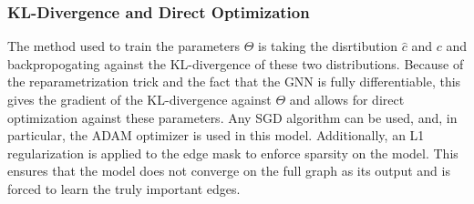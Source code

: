 \subsubsection{KL-Divergence and Direct Optimization}
The method used to train the parameters $\Theta$ is taking the disrtibution $\hat{c}$ and $c$ and backpropogating against the KL-divergence of these two distributions. Because of the reparametrization trick and the fact that the GNN is fully differentiable, this gives the gradient of the KL-divergence against $\Theta$ and allows for direct optimization against these parameters. Any SGD algorithm can be used, and, in particular, the ADAM optimizer \cite{kingma_adam_2017} is used in this model. Additionally, an L1 regularization is applied to the edge mask to enforce sparsity on the model. This ensures that the model does not converge on the full graph as its output and is forced to learn the truly important edges. 

\newpage
